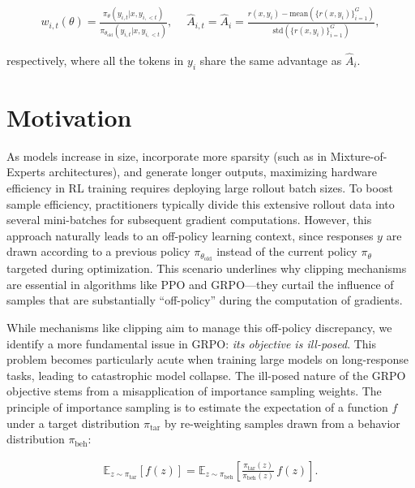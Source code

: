 \begin{align}
    w_{i,t}(\theta)=\frac{ \pi_{\theta} (y_{i,t} | x, y_{i,<t}) }{ \pi_{\theta_\text{old}} (y_{i,t} | x,y_{i,<t})},\quad\ 
    \widehat{A}_{i,t} = \widehat{A}_{i} = \frac{r(x, y_i) - \mathrm{mean} \left( \{ r(x, y_i) \}_{i=1}^G \right) }{ \mathrm{std} \left( \{ r(x, y_i) \}_{i=1}^G \right) },
\end{align}

respectively, where all the tokens in $y_i$ share the same advantage as $\widehat{A}_{i}$.

\section{Motivation}
\label{sec:motivation}

As models increase in size, incorporate more sparsity (such as in Mixture-of-Experts architectures), and generate longer outputs, maximizing hardware efficiency in RL training requires deploying large rollout batch sizes. To boost sample efficiency, practitioners typically divide this extensive rollout data into several mini-batches for subsequent gradient computations. However, this approach naturally leads to an off-policy learning context, since responses $y$ are drawn according to a previous policy $\pi_{\theta_\text{old}}$ instead of the current policy $\pi_\theta$ targeted during optimization. This scenario underlines why clipping mechanisms are essential in algorithms like PPO and GRPO—they curtail the influence of samples that are substantially “off-policy” during the computation of gradients.

While mechanisms like clipping aim to manage this off-policy discrepancy, we identify a more fundamental issue in GRPO: \textit{its objective is ill-posed}. This problem becomes particularly acute when training large models on long-response tasks, leading to catastrophic model collapse. The ill-posed nature of the GRPO objective stems from a misapplication of importance sampling weights. The principle of importance sampling is to estimate the expectation of a function $f$ under a target distribution $\pi_\text{tar}$ by re-weighting samples drawn from a behavior distribution $\pi_\text{beh}$:

\begin{align}
\mathbb{E}_{z \sim \pi_\text{tar}} \left[ f(z) \right] = \mathbb{E}_{z \sim \pi_\text{beh}} \left[ \frac{ \pi_\text{tar} (z) }{ \pi_\text{beh} (z)} \, f(z) \right].
\end{align}

